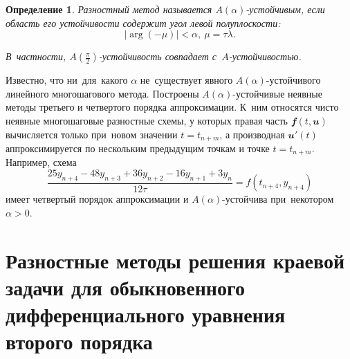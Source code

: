 \documentclass[11pt,a4paper,twoside]{report}
\numberwithin{equation}{section}
\newtheorem*{definition}{Определение}
\theoremstyle{definition}
\theoremstyle{plain}
\newcommand{\vfunc}[1]{\mathbfit{#1}}
\begin{document}
\begin{definition}
    Разностный метод называется $A(\alpha)$-устойчивым, если область его
    устойчивости содержит угол левой полуплоскости:
    $$
        |\operatorname{arg}(-\mu)|<\alpha,~\mu=\tau\lambda.
    $$
    \begin{figure}[H]
        \centering
    \end{figure}

    В~частности, $A\left(\frac{\pi}{2}\right)$-устойчивость совпадает с~$A$-устойчивостью.
\end{definition}





Известно, что ни~для~какого $\alpha$ не~существует явного
$A(\alpha)$-устойчивого линейного многошагового метода. Построены
$A(\alpha)$-устойчивые неявные методы третьего и четвертого порядка аппроксимации.
К~ним относятся чисто неявные многошаговые разностные схемы, у которых правая часть
$\vfunc{f}(t, \vfunc{u})$ вычисляется только при~новом значении $t=t_{n+m}$, а
производная $\vfunc{u}'(t)$ аппроксимируется по нескольким предыдущим точкам и точке
$t=t_{n+m}$. Например, схема
%
$$
    \frac{25y_{n+4}-48y_{n+3}+36y_{n+2}-16y_{n+1}+3y_n}{12\tau}=f(t_{n+4},y_{n+4})
$$
%
имеет четвертый порядок аппроксимации и $A(\alpha)$-устойчива при~некотором
$\alpha > 0$.

%
\section[Разностные методы решения краевой задачи для ОДУ второго порядка]
{Разностные методы решения краевой задачи для обыкновенного дифференциального
уравнения второго порядка}
%
%
\end{document}
